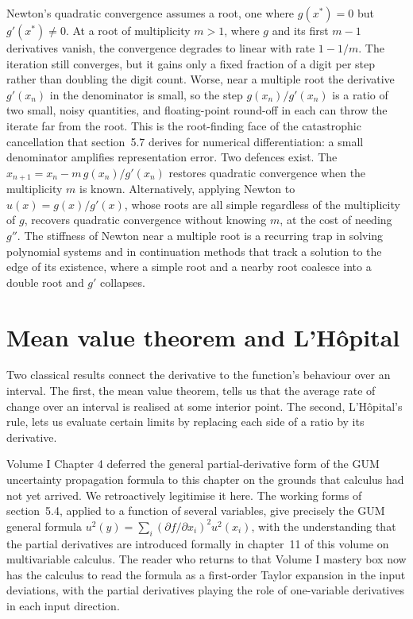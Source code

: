 \begin{mastery}
Newton's quadratic convergence assumes a  root,
one where $g(x^{*}) = 0$ but $g'(x^{*}) \neq 0$. At a root of
multiplicity $m > 1$, where $g$ and its first $m - 1$ derivatives
vanish, the convergence degrades to linear with rate $1 - 1/m$. The
iteration still converges, but it gains only a fixed fraction of a
digit per step rather than doubling the digit count. Worse, near a
multiple root the derivative $g'(x_{n})$ in the denominator is
small, so the step $g(x_{n})/g'(x_{n})$ is a ratio of two small,
noisy quantities, and floating-point round-off in each can throw
the iterate far from the root. This is the root-finding face of the
catastrophic cancellation that section~5.7 derives for numerical
differentiation: a small denominator amplifies representation
error. Two defences exist. The 
$x_{n+1} = x_{n} - m\, g(x_{n})/g'(x_{n})$ restores quadratic
convergence when the multiplicity $m$ is known. Alternatively,
applying Newton to $u(x) = g(x)/g'(x)$, whose roots are all simple
regardless of the multiplicity of $g$, recovers quadratic
convergence without knowing $m$, at the cost of needing $g''$. The
stiffness of Newton near a multiple root is a recurring trap in
solving polynomial systems and in continuation methods that track a
solution to the edge of its existence, where a simple root and a
nearby root coalesce into a double root and $g'$ collapses.
\end{mastery}

\section{Mean value theorem and L'H\^opital}

Two classical results connect the derivative to the function's
behaviour over an interval. The first, the mean value theorem,
tells us that the average rate of change over an interval is
realised at some interior point. The second, L'H\^opital's rule,
lets us evaluate certain limits by replacing each side of a ratio
by its derivative.

Volume I Chapter 4 deferred the general partial-derivative form of
the GUM uncertainty propagation formula to this chapter on the
grounds that calculus had not yet arrived. We retroactively
legitimise it here. The
working forms of section~5.4, applied to a function of several
variables, give precisely the GUM general formula
$u^{2}(y) = \sum_{i} (\partial f / \partial x_{i})^{2} u^{2}(x_{i})$,
with the understanding that the partial derivatives are introduced
formally in chapter~11 of this volume on multivariable calculus.
The reader who returns to that Volume I mastery box now has the
calculus to read the formula as a first-order Taylor expansion in
the input deviations, with the partial derivatives playing the
role of one-variable derivatives in each input direction.

